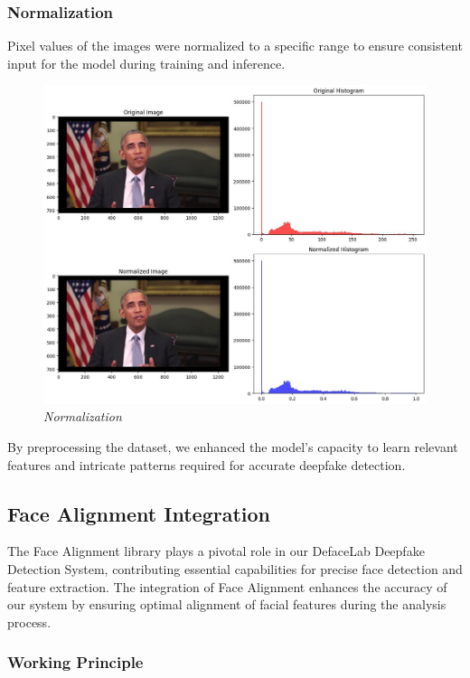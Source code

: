 \subsubsection{Normalization} Pixel values of the images were normalized to a specific range to ensure consistent input for the model during training and inference.

\begin{figure}[htbp]
    \centering
    \includegraphics[width=5in]{img/normalized.jpg}
    \caption{\textit{Normalization}}
\end{figure}

By preprocessing the dataset, we enhanced the model's capacity to learn relevant features and intricate patterns required for accurate deepfake detection.
\newpage

\subsection{Face Alignment Integration}

The Face Alignment library plays a pivotal role in our DefaceLab Deepfake Detection System, contributing essential capabilities for precise face detection and feature extraction. The integration of Face Alignment enhances the accuracy of our system by ensuring optimal alignment of facial features during the analysis process.

\subsubsection{Working Principle}

